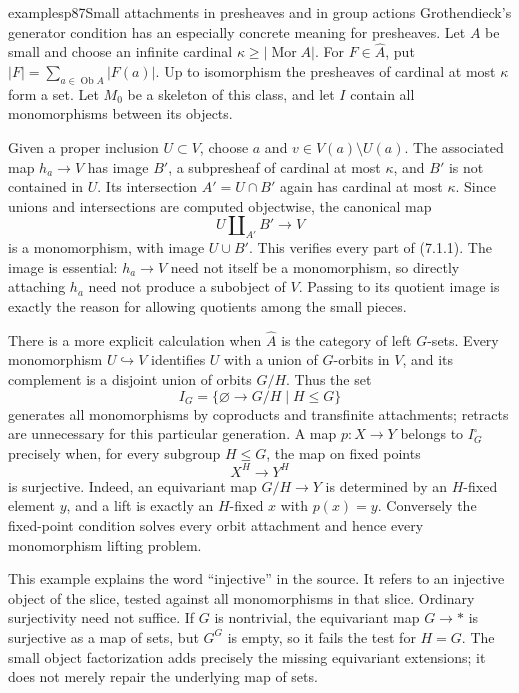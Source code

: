 \begin{dcomment}{examples}{p87}{Small attachments in presheaves and in group actions}
Grothendieck's generator condition has an especially concrete meaning for presheaves. Let $A$ be small and choose an infinite cardinal $\kappa\geq|\operatorname{Mor}A|$. For $F\in\widehat A$, put $|F|=\sum_{a\in\operatorname{Ob}A}|F(a)|$. Up to isomorphism the presheaves of cardinal at most $\kappa$ form a set. Let $M_0$ be a skeleton of this class, and let $I$ contain all monomorphisms between its objects.

Given a proper inclusion $U\subset V$, choose $a$ and $v\in V(a)\setminus U(a)$. The associated map $h_a\to V$ has image $B'$, a subpresheaf of cardinal at most $\kappa$, and $B'$ is not contained in $U$. Its intersection $A'=U\cap B'$ again has cardinal at most $\kappa$. Since unions and intersections are computed objectwise, the canonical map
\[
 U\amalg_{A'}B'\longrightarrow V
\]
is a monomorphism, with image $U\cup B'$. This verifies every part of (7.1.1). The image is essential: $h_a\to V$ need not itself be a monomorphism, so directly attaching $h_a$ need not produce a subobject of $V$. Passing to its quotient image is exactly the reason for allowing quotients among the small pieces.

There is a more explicit calculation when $\widehat A$ is the category of left $G$-sets. Every monomorphism $U\hookrightarrow V$ identifies $U$ with a union of $G$-orbits in $V$, and its complement is a disjoint union of orbits $G/H$. Thus the set
\[
 I_G=\{\varnothing\longrightarrow G/H\mid H\leq G\}
\]
generates all monomorphisms by coproducts and transfinite attachments; retracts are unnecessary for this particular generation. A map $p:X\to Y$ belongs to $I_G^{\square}$ precisely when, for every subgroup $H\leq G$, the map on fixed points
\[
 X^H\longrightarrow Y^H
\]
is surjective. Indeed, an equivariant map $G/H\to Y$ is determined by an $H$-fixed element $y$, and a lift is exactly an $H$-fixed $x$ with $p(x)=y$. Conversely the fixed-point condition solves every orbit attachment and hence every monomorphism lifting problem.

This example explains the word ``injective'' in the source. It refers to an injective object of the slice, tested against all monomorphisms in that slice. Ordinary surjectivity need not suffice. If $G$ is nontrivial, the equivariant map $G\to *$ is surjective as a map of sets, but $G^G$ is empty, so it fails the test for $H=G$. The small object factorization adds precisely the missing equivariant extensions; it does not merely repair the underlying map of sets.
\end{dcomment}

